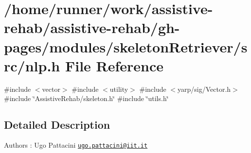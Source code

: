 \section{/home/runner/work/assistive-\/rehab/assistive-\/rehab/gh-\/pages/modules/skeleton\+Retriever/src/nlp.h File Reference}
\label{nlp_8h}
{\ttfamily \#include $<$vector$>$}\newline
{\ttfamily \#include $<$utility$>$}\newline
{\ttfamily \#include $<$yarp/sig/\+Vector.\+h$>$}\newline
{\ttfamily \#include \char`\"{}Assistive\+Rehab/skeleton.\+h\char`\"{}}\newline
{\ttfamily \#include \char`\"{}utils.\+h\char`\"{}}\newline


\subsection{Detailed Description}
\begin{DoxyAuthor}{Authors}
\+: Ugo Pattacini \href{mailto:ugo.pattacini@iit.it}{\tt ugo.\+pattacini@iit.\+it} 
\end{DoxyAuthor}
